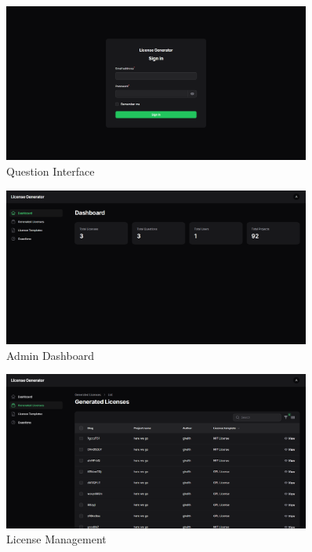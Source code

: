 \documentclass[12pt,a4paper]{report}
\begin{document}
\begin{figure}[H]
    \centering
    \includegraphics[width=0.9\textwidth]{Screenshots/os3.png}
    \caption{Question Interface}
\end{figure}

\begin{figure}[H]
    \centering
    \includegraphics[width=0.9\textwidth]{Screenshots/os4.png}
    \caption{Admin Dashboard}
\end{figure}

\begin{figure}[H]
    \centering
    \includegraphics[width=0.9\textwidth]{Screenshots/os5.png}
    \caption{License Management}
\end{figure}
\end{document}
